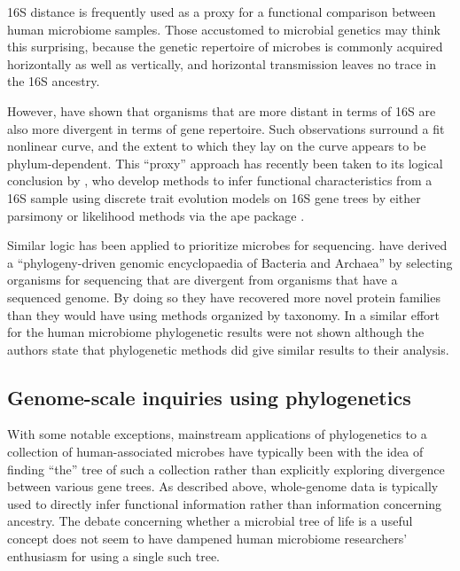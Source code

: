 \documentclass{amsart}
\begin{document}
16S distance is frequently used as a proxy for a functional comparison between human microbiome samples.
Those accustomed to microbial genetics may think this surprising, because the genetic repertoire of microbes is commonly acquired horizontally as well as vertically, and horizontal transmission leaves no trace in the 16S ancestry.

However, \citet{zaneveld2010ribosomal} have shown that organisms that are more distant in terms of 16S are also more divergent in terms of gene repertoire.
Such observations surround a fit nonlinear curve, and the extent to which they lay on the curve appears to be phylum-dependent.
This ``proxy'' approach has recently been taken to its logical conclusion by \citet{langille2013predictive}, who develop methods to infer functional characteristics from a 16S sample using discrete trait evolution models on 16S gene trees by either parsimony \citep{kluge1969quantitative} or likelihood \citep{pagel1994detecting} methods via the ape package \citep{paradis2004ape}.

Similar logic has been applied to prioritize microbes for sequencing.
\citet{wu2009phylogeny} have derived a ``phylogeny-driven genomic encyclopaedia of Bacteria and Archaea'' by selecting organisms for sequencing that are divergent from organisms that have a sequenced genome.
By doing so they have recovered more novel protein families than they would have using methods organized by taxonomy.
In a similar effort for the human microbiome \citep{fodor2012most} phylogenetic results were not shown although the authors state that phylogenetic methods did give similar results to their analysis.


\subsection{Genome-scale inquiries using phylogenetics}
With some notable exceptions, mainstream applications of phylogenetics to a collection of human-associated microbes have typically been with the idea of finding ``the'' tree of such a collection rather than explicitly exploring divergence between various gene trees.
As described above, whole-genome data is typically used to directly infer functional information rather than information concerning ancestry.
The debate concerning whether a microbial tree of life is a useful concept \citep{bapteste2009prokaryotic,caro2012bacterial} does not seem to have dampened human microbiome researchers' enthusiasm for using a single such tree.
\end{document}
